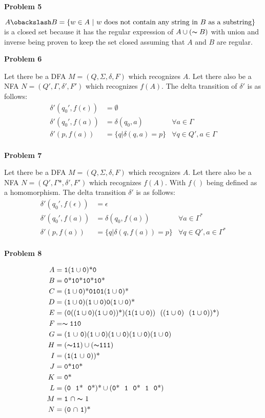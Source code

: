 \documentclass[letterpaper,12pt]{article}
\makeatletter
\newcommand\s[1]{\ensuremath{\mathtt{#1}}}
\newcommand\exercise[1]{\par\vspace{4ex}\normalfont\normalsize\noindent
\textbf{\large Problem #1}\par\nobreak\@afterindentfalse\@afterheading}
\makeatother
\begin{document}
\exercise{5}
$A\obackslash B=\{w\in A\ |\ \text{$w$ does not contain any string in $B$ as a substring}\}$ is a closed set because it has the regular expression of $A \cup (\thicksim B)$ with union and inverse being proven to keep the set closed assuming that $A$ and $B$ are regular.

\exercise{6}
Let there be a DFA $M = (Q,\Sigma,\delta,F)$ which recognizes $A$. Let there also be a NFA $N = (Q', \Gamma,\delta', F')$ which recognizes $f(A)$. The delta transition of $\delta'$ is as follows:
\begin{align*}
	\delta'(q_0',f(\epsilon)) &=  \emptyset\\
	\delta'(q_0',f(a)) &= \delta(q_0,a) & \forall a \in \Gamma\\
	\delta'(p,f(a)) &= \{q|\delta(q,a) = p\} & \forall q \in Q', a \in \Gamma\\
\end{align*}

\exercise{7}
Let there be a DFA $M = (Q,\Sigma,\delta,F)$ which recognizes $A$. Let there also be a NFA $N = (Q', \Gamma*,\delta', F')$ which recognizes $f(A)$. With $f()$ being defined as a homomorphism. The delta transition $\delta'$ is as follows:
\begin{align*}
	\delta'(q_0',f(\epsilon)) &=  \epsilon\\
	\delta'(q_0',f(a)) &= \delta(q_0,f(a)) & \forall a \in \Gamma^*\\
	\delta'(p,f(a)) &= \{q|\delta(q,f(a)) = p\} & \forall q \in Q', a \in \Gamma^*\\
\end{align*}

\exercise{8}
\begin{align*}
A &= \s1  \text{($\s1 \cup \s0$)*}  \s0\\
B &= \s0\text{*}  \s1  \s0\text{*}  \s1  \s0\text{*} \s1   \s0\text{*}\\
C &= \text{($\s1 \cup \s0$)*} \s{0101} \text{($\s1 \cup \s0$)*}\\
D &= \text{($\s1 \cup \s0$)}  \text{($\s1 \cup \s0$)}  \s0  \text{($\s1 \cup \s0$)*}\\
E &= \text{(\s0$$(($\s1 \cup \s0$)}  \text{($\s1 \cup \s0$))*)}  \text{($\s1$($\s1 \cup \s0$)) $$ (($\s1 \cup \s0$) $$ ($\s1 \cup \s0$))*)}\\
F &= \thicksim \text{\s{110}}\\
G &= \text{(\s1 $\cup$ \s0)}  \text{($\s1 \cup \s0$)}  \text{($\s1 \cup \s0$)}  \text{($\s1 \cup \s0$)}  \text{($\s1 \cup \s0$)}\\
H &= \text{($\thicksim$\s{11})} \cup \text{($\thicksim$\s{111})}\\
I &= \text{(\s1}  \text{(\s1 $\cup$ \s0))*} \\
J &= \text{\s0*}  \text{\s1}  \text{\s0*}\\
K &= \text{\s0*}\\
L &= \text{(\s0 $$ \s1* $$ \s0*)*} \cup\text{(\s0* $$ \s1 $$ \s0* $$ \s1 $$ \s0*)}\\
M &= \text{\s1 $\cap \thicksim$ 1}\\
N &= \text{(\s0 $\cap$ \s1)*}\\
\end{align*}
\end{document}
